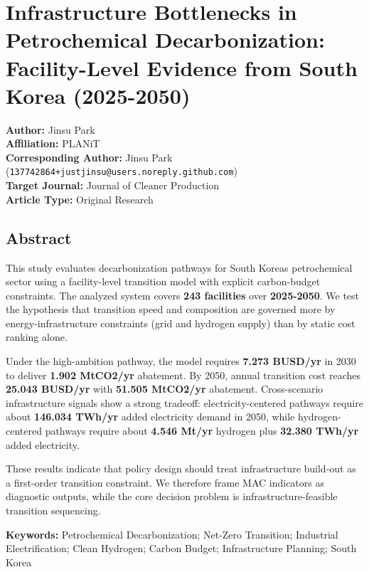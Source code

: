 \documentclass[
]{article}
\author{}
\date{}
\begin{document}
\section{Infrastructure Bottlenecks in Petrochemical Decarbonization:
Facility-Level Evidence from South Korea
(2025-2050)}\label{infrastructure-bottlenecks-in-petrochemical-decarbonization-facility-level-evidence-from-south-korea-2025-2050}

\textbf{Author:} Jinsu Park\\
\textbf{Affiliation:} PLANiT\\
\textbf{Corresponding Author:} Jinsu Park
(\texttt{137742864+justjinsu@users.noreply.github.com})\\
\textbf{Target Journal:} Journal of Cleaner Production\\
\textbf{Article Type:} Original Research

\subsection{Abstract}\label{abstract}

This study evaluates decarbonization pathways for South
Korea\textquotesingle s petrochemical sector using a facility-level
transition model with explicit carbon-budget constraints. The analyzed
system covers \textbf{243 facilities} over \textbf{2025-2050}. We test
the hypothesis that transition speed and composition are governed more
by energy-infrastructure constraints (grid and hydrogen supply) than by
static cost ranking alone.

Under the high-ambition pathway, the model requires \textbf{7.273
BUSD/yr} in 2030 to deliver \textbf{1.902 MtCO2/yr} abatement. By 2050,
annual transition cost reaches \textbf{25.043 BUSD/yr} with
\textbf{51.505 MtCO2/yr} abatement. Cross-scenario infrastructure
signals show a strong tradeoff: electricity-centered pathways require
about \textbf{146.034 TWh/yr} added electricity demand in 2050, while
hydrogen-centered pathways require about \textbf{4.546 Mt/yr} hydrogen
plus \textbf{32.380 TWh/yr} added electricity.

These results indicate that policy design should treat infrastructure
build-out as a first-order transition constraint. We therefore frame MAC
indicators as diagnostic outputs, while the core decision problem is
infrastructure-feasible transition sequencing.

\textbf{Keywords:} Petrochemical Decarbonization; Net-Zero Transition;
Industrial Electrification; Clean Hydrogen; Carbon Budget;
Infrastructure Planning; South Korea
\end{document}
